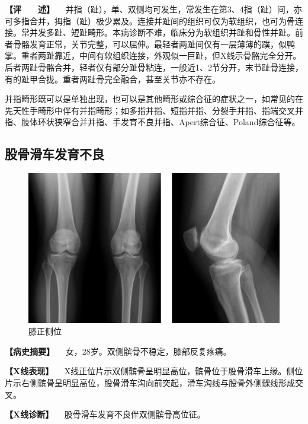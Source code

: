 \textbf{【评　　述】}
　并指（趾），单、双侧均可发生，常发生在第3、4指（趾）间，亦可多指合并，拇指（趾）极少累及。连接并趾间的组织可仅为软组织，也可为骨连接。常并发多趾、短趾畸形。本病诊断不难，临床分为软组织并趾和骨性并趾。前者骨骼发育正常，关节完整，可以屈伸。最轻者两趾间仅有一层薄薄的蹼，似鸭掌。重者两趾靠近，中间有软组织连接，外观似一巨趾，但X线示骨骼完全分开。后者两趾骨骼合并，轻者仅有部分趾骨粘连，一般近1、2节分开，末节趾骨连接，有的趾甲合拢。重者两趾骨完全融合，甚至关节亦不存在。

并指畸形既可以是单独出现，也可以是其他畸形或综合征的症状之一，如常见的在先天性手畸形中伴有并指畸形；如多指并指、短指并指、分裂手并指、指端交叉并指、肢体环状狭窄合并并指、手发育不良并指、Apert综合征、Poland综合征等。

\subsection{股骨滑车发育不良}

\begin{figure}[!htbp]
 \centering
 \includegraphics{./images/Image00026.jpg}
 \captionsetup{justification=centering}
 \caption{膝正侧位}
 \label{fig2-2-9}
  \end{figure} 

\textbf{【病史摘要】} 　女，28岁。双侧髌骨不稳定，膝部反复疼痛。

\textbf{【X线表现】}
　X线正位片示双侧髌骨呈明显高位，髌骨位于股骨滑车上缘。侧位片示右侧髌骨呈明显高位，股骨滑车沟向前突起，滑车沟线与股骨外侧髁线形成交叉。

\textbf{【X线诊断】} 　股骨滑车发育不良伴双侧髌骨高位征。

